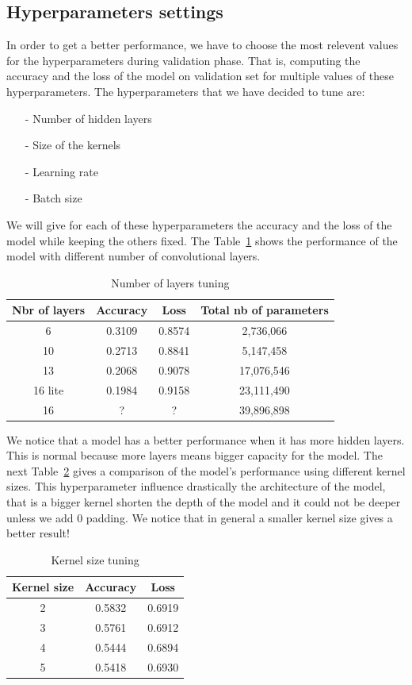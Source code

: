 \documentclass[a4paper]{article}
\begin{document}
\subsection{Hyperparameters settings}
In order to get a better performance, we have to choose the most relevent values for the hyperparameters during validation phase. That is, computing the accuracy and the loss of the model on validation set for multiple values of these hyperparameters.
%
The hyperparameters that we have decided to tune are:
\begin{itemize}
\setlength\itemsep{0em}
\item[-]Number of hidden layers
\item[-]Size of the kernels
\item[-]Learning rate
\item[-]Batch size
\end{itemize}
%
We will give for each of these hyperparameters the accuracy and the loss of the model while keeping the others fixed.
%
The Table~\ref{table:1} shows the performance of the model with different number of convolutional layers.
%
\begin{table}[h!]
	\centering
	\begin{tabular}{||c c c c||} 
		\hline
		Nbr of layers & Accuracy & Loss & Total nb of parameters\\ [0.5ex] 
		\hline\hline
		6 & 0.3109 & 0.8574 & 2,736,066\\ 
		10 & 0.2713 & 0.8841 & 5,147,458\\ 
		13 & 0.2068 & 0.9078 & 17,076,546\\ 
		16 lite & 0.1984 & 0.9158 & 23,111,490\\ 
		16 & ? & ? & 39,896,898\\  [1ex] 
		\hline
	\end{tabular}
	\caption{Number of layers tuning}
	\label{table:1}
\end{table}
%
We notice that a model has a better performance when it has more hidden layers. This is normal because more layers means bigger capacity for the model.
%
The next Table~\ref{table:2} gives a comparison of the model's performance using different kernel sizes. This hyperparameter influence drastically the architecture of the model, that is a bigger kernel shorten the depth of the model and it could not be deeper unless we add 0 padding. We notice that in general a smaller kernel size gives a better result!

\begin{table}[h!]
	\centering
	\begin{tabular}{||c c c||} 
		\hline
		Kernel size & Accuracy & Loss \\ [0.5ex] 
		\hline\hline
		2 & 0.5832 & 0.6919 \\ 
		3 & 0.5761 & 0.6912 \\ 
		4 & 0.5444 & 0.6894 \\ 
		5 & 0.5418 & 0.6930 \\ [1ex]  
		\hline
	\end{tabular}
	\caption{Kernel size tuning}
	\label{table:2}
\end{table}
\end{document}
